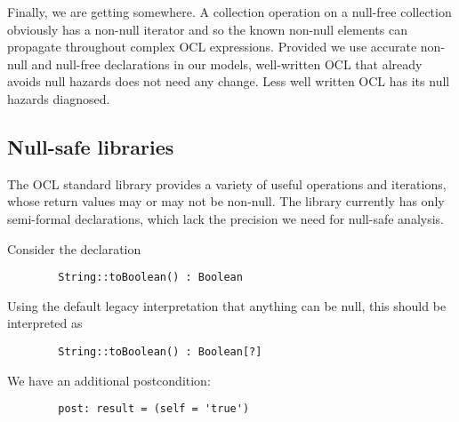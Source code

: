 \documentclass{llncs}
\begin{document}
Finally, we are getting somewhere. A collection operation on a null-free collection obviously has a non-null iterator and so the known non-null elements can propagate throughout complex OCL expressions. Provided we use accurate non-null and null-free declarations in our models, well-written OCL that already avoids null hazards does not need any change. Less well written OCL has its null hazards diagnosed.







\subsection{Null-safe libraries}

The OCL standard library provides a variety of useful operations and iterations, whose return values may or may not be non-null. The library currently has only semi-formal declarations, which lack the precision we need for null-safe analysis.

Consider the declaration
\begin{verbatim}
        String::toBoolean() : Boolean
\end{verbatim}
Using the default legacy interpretation that anything can be null, this should be interpreted as
\begin{verbatim}
        String::toBoolean() : Boolean[?]
\end{verbatim}
We have an additional postcondition:
\begin{verbatim}
        post: result = (self = 'true')
\end{verbatim}
\end{document}
